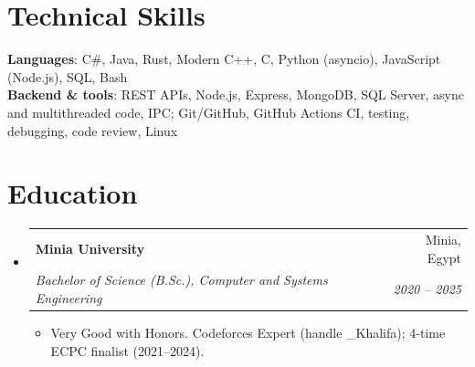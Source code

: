 \documentclass[letterpaper,11pt]{article}
\makeatletter
\newcommand{\resumeItem}[1]{
  \item\small{
    {#1 \vspace{-2pt}}
  }
}
\newcommand{\resumeSubheading}[4]{
  \vspace{-2pt}\item
    \begin{tabular*}{0.97\textwidth}[t]{l@{\extracolsep{\fill}}r}
      \textbf{#1} & #2 \\
      \textit{\small#3} & \textit{\small #4} \\
    \end{tabular*}\vspace{-7pt}
}
\newcommand{\resumeSubHeadingListStart}{\begin{itemize}[leftmargin=0.15in, label={}]}
\newcommand{\resumeSubHeadingListEnd}{\end{itemize}}
\newcommand{\resumeItemListStart}{\begin{itemize}}
\newcommand{\resumeItemListEnd}{\end{itemize}\vspace{-5pt}}
\makeatother
\begin{document}
%
\section{Technical Skills}
 \begin{itemize}[leftmargin=0.15in, label={}]
    \small{\item{
     \textbf{Languages}{: C\#, Java, Rust, Modern C++, C, Python (asyncio), JavaScript (Node.js), SQL, Bash} \\
     \textbf{Backend \& tools}{: REST APIs, Node.js, Express, MongoDB, SQL Server, async and multithreaded code, IPC; Git/GitHub, GitHub Actions CI, testing, debugging, code review, Linux}
    }}
 \end{itemize}

\section{Education}
  \resumeSubHeadingListStart
    \resumeSubheading
      {Minia University}{Minia, Egypt}
      {Bachelor of Science (B.Sc.), Computer and Systems Engineering}{2020 -- 2025}
      \resumeItemListStart
        \resumeItem{Very Good with Honors. Codeforces Expert (handle \_Khalifa); 4-time ECPC finalist (2021--2024).}
      \resumeItemListEnd
  \resumeSubHeadingListEnd


\end{document}
